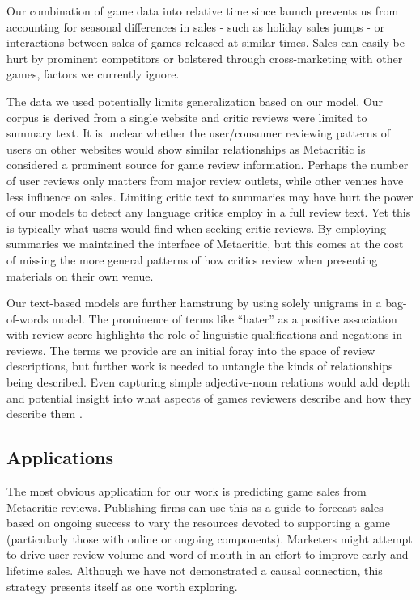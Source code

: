 \documentclass[letterpaper]{article}
\begin{document}
Our combination of game data into relative time since launch prevents us from accounting for seasonal differences in sales - such as holiday sales jumps - or interactions between sales of games released at similar times. Sales can easily be hurt by prominent competitors or bolstered through cross-marketing with other games, factors we currently ignore.

The data we used potentially limits generalization based on our model. Our corpus is derived from a single website and critic reviews were limited to summary text. It is unclear whether the user/consumer reviewing patterns of users on other websites would show similar relationships as Metacritic is considered a prominent source for game review information. Perhaps the number of user reviews only matters from major review outlets, while other venues have less influence on sales. Limiting critic text to summaries may have hurt the power of our models to detect any language critics employ in a full review text. Yet this is typically what users would find when seeking critic reviews. By employing summaries we maintained the interface of Metacritic, but this comes at the cost of missing the more general patterns of how critics review when presenting materials on their own venue.

Our text-based models are further hamstrung by using solely unigrams in a bag-of-words model. The prominence of terms like ``hater'' as a positive association with review score highlights the role of linguistic qualifications and negations in reviews. The terms we provide are an initial foray into the space of review descriptions, but further work is needed to untangle the kinds of relationships being described. Even capturing simple adjective-noun relations would add depth and potential insight into what aspects of games reviewers describe and how they describe them .

\subsection{Applications}
The most obvious application for our work is predicting game sales from Metacritic reviews. Publishing firms can use this as a guide to forecast sales based on ongoing success to vary the resources devoted to supporting a game (particularly those with online or ongoing components). Marketers might attempt to drive user review volume and word-of-mouth in an effort to improve early and lifetime sales. Although we have not demonstrated a causal connection, this strategy presents itself as one worth exploring.
\end{document}
